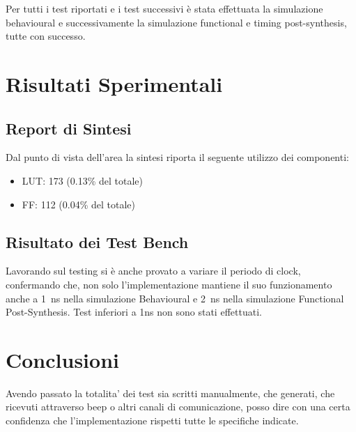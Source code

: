 \documentclass{article}
\begin{document}
Per tutti i test riportati e i test successivi è stata effettuata la simulazione behavioural e successivamente la simulazione functional e timing post-synthesis, tutte con successo.\\

\section{Risultati Sperimentali}
\label{risultati}

\subsection{Report di Sintesi}

Dal punto di vista dell'area la sintesi riporta il seguente utilizzo dei componenti:
\begin{itemize}
\item LUT: 173 (0.13\% del totale)
\item FF: 112 (0.04\% del totale)
\end{itemize}

\subsection{Risultato dei Test Bench}

Lavorando sul testing si è anche provato a variare il periodo di clock, confermando che, non solo l'implementazione mantiene il suo funzionamento anche a \SI{1}{\ns} nella simulazione Behavioural e \SI{2}{\ns} nella simulazione Functional Post-Synthesis. Test inferiori a 1ns non sono stati effettuati.\\

\section{Conclusioni}

Avendo passato la totalita' dei test sia scritti manualmente, che generati, che ricevuti attraverso beep o altri canali di comunicazione, posso dire con una certa confidenza che l'implementazione rispetti tutte le specifiche indicate.
\end{document}
